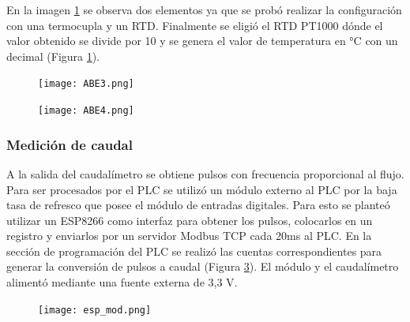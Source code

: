 En la imagen \ref{fig:ABE3} se observa dos elementos ya que se probó realizar la configuración con una termocupla y un RTD. Finalmente se eligió el RTD PT1000 dónde el valor obtenido se divide por 10 y se genera el valor de temperatura en °C con un decimal  (Figura \ref{fig:ABE3}).

\begin{figure}[H]
	\centering
	\texttt{[image: ABE3.png]}
	\label{fig:ABE3}
\end{figure}

\begin{figure}[H]
	\centering
	\texttt{[image: ABE4.png]}
	\label{fig:ABE4}
\end{figure}

\subsubsection{Medición de caudal}
A la salida del caudalímetro se obtiene pulsos con frecuencia proporcional al flujo. Para ser procesados por el PLC se utilizó un módulo externo al PLC por la baja tasa de refresco que posee el módulo de entradas digitales. Para esto se planteó utilizar un ESP8266 como interfaz para obtener los pulsos, colocarlos en un registro y enviarlos por un servidor Modbus TCP cada 20ms al PLC. En la sección de programación del PLC se realizó las cuentas correspondientes para generar la conversión de pulsos a caudal (Figura \ref{fig:modtcp}). El módulo y el caudalímetro alimentó mediante una fuente externa de 3,3 V.
\begin{figure}[htbp]
	\centering
	\texttt{[image: esp\_mod.png]}
	\label{fig:modtcp}
\end{figure}
\newpage

